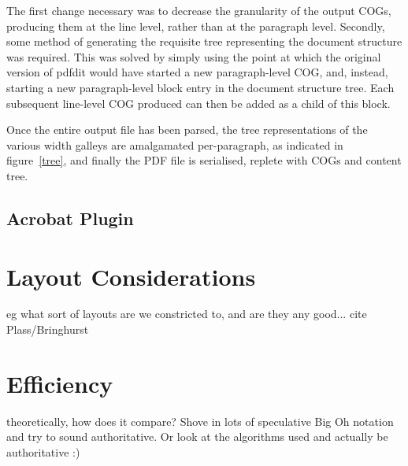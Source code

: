 The first change necessary was to decrease the granularity of the output COGs, producing them at the line level, rather than at the paragraph level. Secondly, some method of generating the requisite tree representing the document structure was required. This was solved by simply using the point at which the original version of pdfdit would have started a new paragraph-level COG, and, instead, starting a new paragraph-level block entry in the document structure tree. Each subsequent line-level COG produced can then be added as a child of this block.

Once the entire output file has been parsed, the tree representations of the various width galleys are amalgamated per-paragraph, as indicated in figure~\ref{tree}, and finally the PDF file is serialised, replete with COGs and content tree.

\subsection{Acrobat Plugin}



\section{Layout Considerations}
eg what sort of layouts are we constricted to, and are they any good... cite Plass/Bringhurst

\section{Efficiency}
theoretically, how does it compare? Shove in lots of speculative Big Oh notation and try to sound authoritative. Or look at the algorithms used and
actually be authoritative :)



